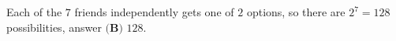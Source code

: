 Each of the $7$ friends independently gets one of $2$ options, so there are $2^7=128$ possibilities, answer $\boxed{\textbf{(B) }128}$.

